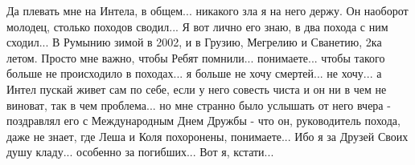 Да плевать мне на Интела, в общем... никакого зла я на него держу. Он наоборот
молодец, столько походов сводил... Я вот лично его знаю, в два похода с ним
сходил... В Румынию зимой в 2002, и в Грузию, Мегрелию и Сванетию, 2ка летом.
Просто мне важно, чтобы Ребят помнили... понимаете... чтобы такого больше не
происходило в походах... я больше не хочу смертей... не хочу... а Интел пускай
живет сам по себе, если у него совесть чиста и он ни в чем не виноват, так в
чем проблема... но мне странно было услышать от него вчера - поздравлял его с
Международным Днем Дружбы - что он, руководитель похода, даже не знает, где
Леша и Коля похоронены, понимаете... Ибо я за Друзей Своих душу кладу...
особенно за погибших... Вот я, кстати...
 
  
